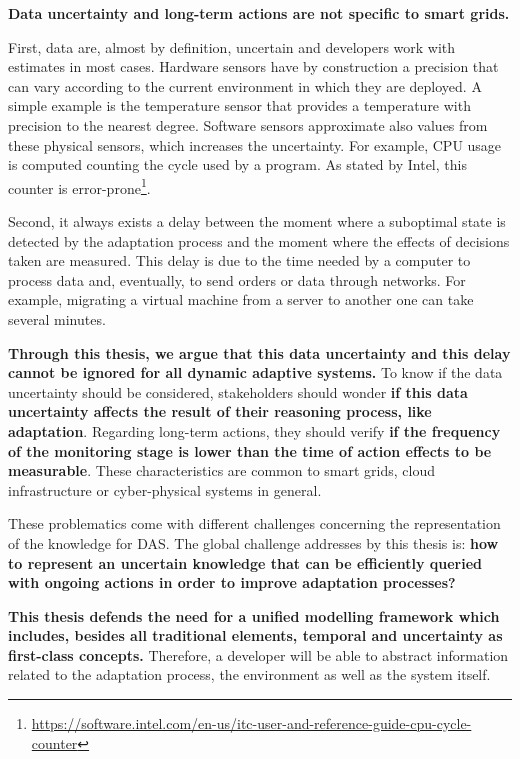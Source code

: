 \bigskip
{}
\textbf{Data uncertainty and long-term actions are not specific to smart grids.}

First, data are, almost by definition, uncertain and developers work with estimates in most cases.
Hardware sensors have by construction a precision that can vary according to the current environment in which they are deployed.
A simple example is the temperature sensor that provides a temperature with precision to the nearest degree.
Software sensors approximate also values from these physical sensors, which increases the uncertainty.
For example, CPU usage is computed counting the cycle used by a program.
As stated by Intel, this counter is error-prone\footnote{\url{https://software.intel.com/en-us/itc-user-and-reference-guide-cpu-cycle-counter}}.

Second, it always exists a delay between the moment where a suboptimal state is detected by the adaptation process and the moment where the effects of decisions taken are measured.
This delay is due to the time needed by a computer to process data and, eventually, to send orders or data through networks.
For example, migrating a virtual machine from a server to another one can take several minutes.

\textbf{Through this thesis, we argue that this data uncertainty and this delay cannot be ignored for all dynamic adaptive systems.}
To know if the data uncertainty should be considered, stakeholders should wonder \textbf{if this data uncertainty affects the result of their reasoning process, like adaptation}.
Regarding long-term actions, they should verify \textbf{if the frequency of the monitoring stage is lower than the time of action effects to be measurable}.
These characteristics are common to smart grids, cloud infrastructure or cyber-physical systems in general.

\bigskip
{}
These problematics come with different challenges concerning the representation of the knowledge for DAS.
The global challenge addresses by this thesis is: \textbf{how to represent an uncertain knowledge that can be efficiently queried with ongoing actions in order to improve adaptation processes?}

%

\bigskip
{}
\textbf{This thesis defends the need for a unified modelling framework which includes, besides all traditional elements, temporal and uncertainty as first-class concepts.}
Therefore, a developer will be able to abstract information related to the adaptation process, the environment as well as the system itself.

